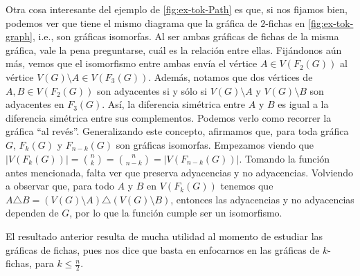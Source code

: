 \newpage

Otra cosa interesante del ejemplo de \cref{fig:ex-tok-Path} es que, si nos
fijamos bien, podemos ver que tiene el mismo diagrama que la gr\'afica de
$2$-fichas en \cref{fig:ex-tok-graph}, i.e., son gr\'aficas isomorfas. Al ser
ambas gr\'aficas de fichas de la misma gr\'afica, vale la pena preguntarse,
cu\'al es la relaci\'on entre ellas. Fij\'andonos a\'un m\'as, vemos que el
isomorfismo entre ambas env\'ia el v\'ertice $A \in V(F_2(G))$ al v\'ertice
$V(G) \setminus A \in V(F_3(G))$. Adem\'as, notamos que dos v\'ertices de $ A,B
\in V(F_2(G))$ son adyacentes si y s\'olo si $V(G) \setminus A$ y $V(G)
\setminus B$ son adyacentes en $F_3(G)$. As\'i, la diferencia sim\'etrica entre
$A$ y $B$ es igual a la diferencia sim\'etrica entre sus complementos. Podemos
verlo como recorrer la gr\'afica ``al rev\'es''. Generalizando este concepto,
afirmamos que, para toda gr\'afica $G$, $F_k(G)$ y $F_{n-k}(G)$ son gr\'aficas
isomorfas. Empezamos viendo que $|V(F_k(G))| =\binom{n}{k}= \binom{n}{n-k}=
|V(F_{n-k}(G))|$. Tomando la funci\'on antes mencionada, falta ver que preserva
adyacencias y no adyacencias. Volviendo a observar que, para todo $A$ y $B$ en
$V(F_k(G))$ tenemos que $A \triangle B = (V(G)\setminus A) \triangle
(V(G)\setminus B)$, entonces las adyacencias y no adyacencias dependen de $G$,
por lo que la funci\'on cumple ser un isomorfismo. 

El resultado anterior resulta de mucha utilidad al momento de estudiar las
gr\'aficas de fichas, pues nos dice que basta en enfocarnos en las gr\'aficas de
$k$-fichas, para $k \leq \frac{n}{2}$.
